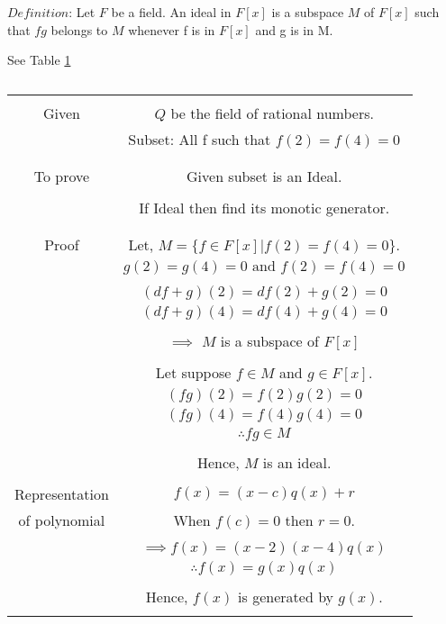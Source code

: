$Definition$: Let $F$ be a field. An ideal in $F[x]$ is a subspace $M$ of $F[x]$ such that $fg$ belongs to $M$ whenever f is in $F[x]$ and g is in M.

See Table \ref{table:solutions/4/3/1/d/}


\begin{table}[h!]
\begin{center}
\resizebox{\columnwidth}{!}
{
\begin{tabular}{|c|c|}
\hline
& \\
Given & $Q$ be the field of rational numbers.\\
& Subset: All f such that $f(2)=f(4)=0$\\
&\\
\hline
& \\
To prove & Given subset is an Ideal.\\
&\\
 & If Ideal then find its monotic generator.\\
& \\
\hline
& \\
Proof  & Let, $M=\{f\in F[x] | f(2)=f(4)=0\}$.\\
& $g(2)=g(4)=0 \text{  and } f(2)=f(4)=0$\\
& \\
& $(df+g)(2)=df(2)+g(2)=0$\\
& $(df+g)(4)=df(4)+g(4)=0$ \\
& \\
& $\implies$ $M$ is a subspace of $F[x]$\\
&\\
& Let suppose $f \in M$ and $g \in F[x]$.\\
& $(fg)(2)=f(2)g(2)=0$\\
& $(fg)(4)=f(4)g(4)=0$\\
& $\therefore fg \in M$\\
&\\
& Hence, $M$ is an ideal.\\
& \\
Representation & $f(x)=(x-c)q(x)+r$\\
of polynomial & When $f(c)=0$ then $r=0$.\\
& \\
& $\implies f(x)=(x-2)(x-4)q(x)$\\
& $\therefore f(x)=g(x)q(x)$\\
&\\
& Hence, $f(x)$ is generated by $g(x)$.\\
&\\
\hline
\end{tabular}
}
\end{center}
\caption{}
\label{table:solutions/4/3/1/d/}
\end{table}

